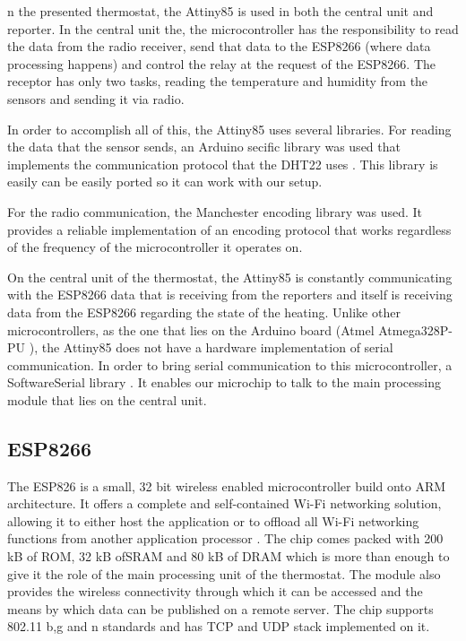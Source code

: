 \qquad n the presented thermostat, the Attiny85 is used in both the central unit and reporter. In the central unit
the, the microcontroller has the responsibility to read the data from the radio receiver, send that data to
the ESP8266 (where data processing happens) and control the relay at the request of the ESP8266.
The receptor has only two tasks, reading the temperature and humidity from the sensors and sending it via
radio.

In order to accomplish all of this, the Attiny85 uses several libraries.
For reading the data that the sensor sends, an Arduino secific library was used that implements the
communication protocol that the DHT22 uses \cite{website:dht22_library}. This library is easily can be easily
ported so it can work with our setup.

For the radio communication, the Manchester encoding library \cite{website:manchester} was used. It provides
a reliable implementation of an encoding protocol that works regardless of the frequency of the
microcontroller it operates on.

\qquad On the central unit of the thermostat, the Attiny85 is constantly communicating with the ESP8266 data that is
receiving from the reporters and itself is receiving data from the ESP8266 regarding the state of the heating.
Unlike other microcontrollers, as the one that lies on the Arduino board (Atmel Atmega328P-PU
\cite{datasheet:atmega328}), the Attiny85 does not have a hardware implementation of serial communication. In
order to bring serial communication to this microcontroller, a SoftwareSerial library
\cite{website:softserial}. It enables our microchip to talk to the main processing module that lies on the
central unit.


\subsection{ESP8266}
\label{sec:esp8266}

\qquad The ESP826 is a small, 32 bit wireless enabled microcontroller build onto ARM architecture. It offers a
complete and self-contained Wi-Fi networking solution, allowing it to either host the application or to
offload all Wi-Fi networking functions from another application processor \cite{website:espressifdesc}.
The chip comes packed with 200 kB of ROM, 32 kB ofSRAM and 80 kB of DRAM which is more than enough to give it
the role of the main processing unit of the thermostat. The module also provides the wireless connectivity
through which it can be accessed and the means by which data can be published on a remote server. The chip
supports 802.11 b,g and n standards and has TCP and UDP stack implemented on it.

